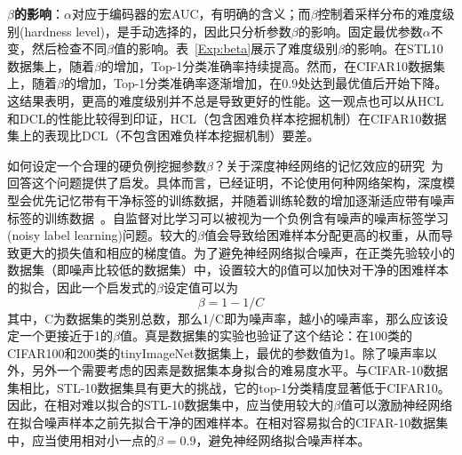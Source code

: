 \textbf{$\beta$的影响}：$\alpha$对应于编码器的宏AUC，有明确的含义；而$\beta$控制着采样分布的难度级别(hardness level)，是手动选择的，因此只分析参数$\beta$的影响。固定最优参数$\alpha$不变，然后检查不同$\beta$值的影响。表~\ref{Exp:beta}展示了难度级别$\beta$的影响。在STL10数据集上，随着$\beta$的增加，Top-1分类准确率持续提高。然而，在CIFAR10数据集上，随着$\beta$的增加，Top-1分类准确率逐渐增加，在0.9处达到最优值后开始下降。这结果表明，更高的难度级别并不总是导致更好的性能。这一观点也可以从HCL和DCL的性能比较得到印证，HCL（包含困难负样本挖掘机制）在CIFAR10数据集上的表现比DCL（不包含困难负样本挖掘机制）要差。

如何设定一个合理的硬负例挖掘参数$\beta$？关于深度神经网络的记忆效应的研究~\cite{Arpit:2017:ICML}为回答这个问题提供了启发。具体而言，已经证明，不论使用何种网络架构，深度模型会优先记忆带有干净标签的训练数据，并随着训练轮数的增加逐渐适应带有噪声标签的训练数据~\cite{zhang2021understanding, Han:2018:NIPS}。自监督对比学习可以被视为一个负例含有噪声的噪声标签学习(noisy label learning)问题。较大的$\beta$值会导致给困难样本分配更高的权重，从而导致更大的损失值和相应的梯度值。为了避免神经网络拟合噪声，在正类先验较小的数据集（即噪声比较低的数据集）中，设置较大的β值可以加快对干净的困难样本的拟合，因此一个启发式的$\beta$设定值可以为
\[\beta = 1-1/C\]
其中，C为数据集的类别总数，那么1/C即为噪声率，越小的噪声率，那么应该设定一个更接近于1的$\beta$值。真是数据集的实验也验证了这个结论：在100类的CIFAR100和200类的tinyImageNet数据集上，最优的参数值为1。除了噪声率以外，另外一个需要考虑的因素是数据集本身拟合的难易度水平。与CIFAR-10数据集相比，STL-10数据集具有更大的挑战，它的top-1分类精度显著低于CIFAR10。因此，在相对难以拟合的STL-10数据集中，应当使用较大的$\beta$值可以激励神经网络在拟合噪声样本之前先拟合干净的困难样本。在相对容易拟合的CIFAR-10数据集中，应当使用相对小一点的$\beta=0.9$，避免神经网络拟合噪声样本。

\begin{table}[h!]
	\centering
	\caption{正例类先验概率$\tau^+$的影响}\label{Exp:tau}
\end{table}

